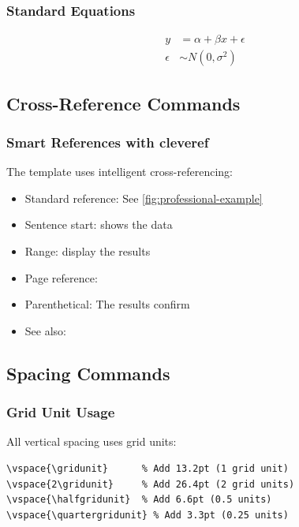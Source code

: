\subsubsection{Standard Equations}

\begin{align}
  y &= \alpha + \beta x + \epsilon \\
  \epsilon &\sim N(0, \sigma^2)
\end{align}

\subsection{Cross-Reference Commands}

\subsubsection{Smart References with cleveref}

The template uses intelligent cross-referencing:

\begin{itemize}
\item Standard reference: See \cref{fig:professional-example}
\item Sentence start:  shows the data
\item Range:  display the results
\item Page reference: 
\item Parenthetical: The results  confirm
\item See also: 
\end{itemize}

\subsection{Spacing Commands}

\subsubsection{Grid Unit Usage}

All vertical spacing uses grid units:

\begin{verbatim}
\vspace{\gridunit}      % Add 13.2pt (1 grid unit)
\vspace{2\gridunit}     % Add 26.4pt (2 grid units)
\vspace{\halfgridunit}  % Add 6.6pt (0.5 units)
\vspace{\quartergridunit} % Add 3.3pt (0.25 units)
\end{verbatim}

